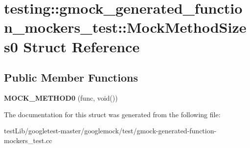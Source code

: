 \hypertarget{structtesting_1_1gmock__generated__function__mockers__test_1_1MockMethodSizes0}{}\section{testing\+:\+:gmock\+\_\+generated\+\_\+function\+\_\+mockers\+\_\+test\+:\+:Mock\+Method\+Sizes0 Struct Reference}
\label{structtesting_1_1gmock__generated__function__mockers__test_1_1MockMethodSizes0}
\subsection*{Public Member Functions}
\begin{DoxyCompactItemize}
\item 
\mbox{\label{structtesting_1_1gmock__generated__function__mockers__test_1_1MockMethodSizes0_ad72a29f7a84b94e60a6697952d086ec9}} 
{\bfseries M\+O\+C\+K\+\_\+\+M\+E\+T\+H\+O\+D0} (func, void())
\end{DoxyCompactItemize}


The documentation for this struct was generated from the following file\+:\begin{DoxyCompactItemize}
\item 
test\+Lib/googletest-\/master/googlemock/test/gmock-\/generated-\/function-\/mockers\+\_\+test.\+cc\end{DoxyCompactItemize}
